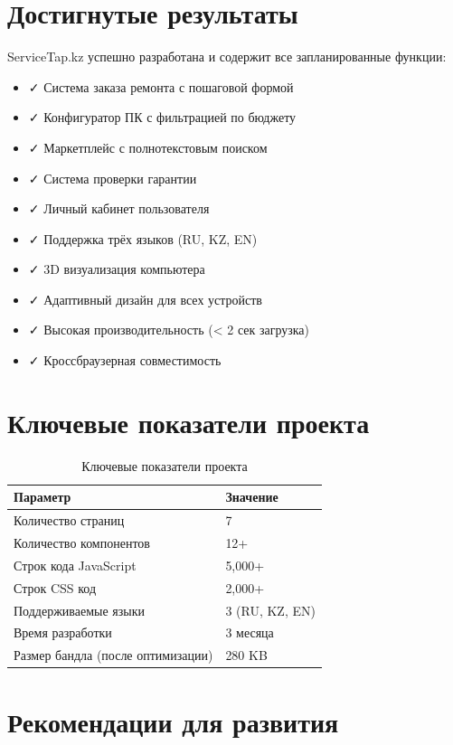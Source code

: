 \documentclass[12pt,a4paper]{report}
\begin{document}
\section{Достигнутые результаты}

ServiceTap.kz успешно разработана и содержит все запланированные функции:

\begin{itemize}
    \item ✓ Система заказа ремонта с пошаговой формой
    \item ✓ Конфигуратор ПК с фильтрацией по бюджету
    \item ✓ Маркетплейс с полнотекстовым поиском
    \item ✓ Система проверки гарантии
    \item ✓ Личный кабинет пользователя
    \item ✓ Поддержка трёх языков (RU, KZ, EN)
    \item ✓ 3D визуализация компьютера
    \item ✓ Адаптивный дизайн для всех устройств
    \item ✓ Высокая производительность (< 2 сек загрузка)
    \item ✓ Кроссбраузерная совместимость
\end{itemize}

\section{Ключевые показатели проекта}

\begin{table}[H]
\centering
\begin{tabular}{|l|l|}
\hline
\textbf{Параметр} & \textbf{Значение} \\
\hline
Количество страниц & 7 \\
Количество компонентов & 12+ \\
Строк кода JavaScript & 5,000+ \\
Строк CSS код & 2,000+ \\
Поддерживаемые языки & 3 (RU, KZ, EN) \\
Время разработки & 3 месяца \\
Размер бандла (после оптимизации) & 280 KB \\
\hline
\end{tabular}
\caption{Ключевые показатели проекта}
\end{table}

\section{Рекомендации для развития}
\end{document}

